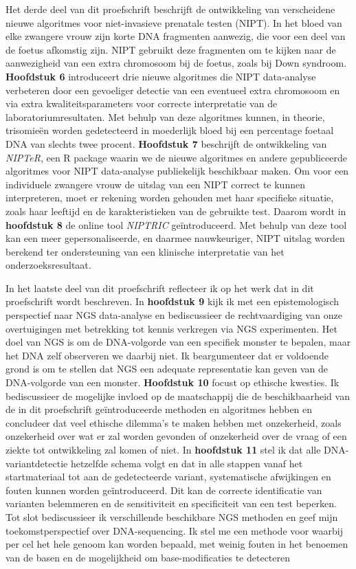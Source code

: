 \begin{appendices}
	Het derde deel van dit proefschrift beschrijft de ontwikkeling van verscheidene nieuwe algoritmes voor niet-invasieve prenatale testen (NIPT). In het bloed van elke zwangere vrouw zijn korte DNA fragmenten aanwezig, die voor een deel van de foetus afkomstig zijn. NIPT gebruikt deze fragmenten om te kijken naar de aanwezigheid van een extra chromosoom bij de foetus, zoals bij Down syndroom. \textbf{Hoofdstuk 6} introduceert drie nieuwe algoritmes die NIPT data-analyse verbeteren door een gevoeliger detectie van een eventueel extra chromosoom en via extra kwaliteitsparameters voor correcte interpretatie van de laboratoriumresultaten. Met behulp van deze algoritmes kunnen, in theorie, trisomieën worden gedetecteerd in moederlijk bloed bij een percentage foetaal DNA van slechts twee procent. \textbf{Hoofdstuk 7} beschrijft de ontwikkeling van \textsl{NIPTeR}, een R package waarin we de nieuwe algoritmes en andere gepubliceerde algoritmes voor NIPT data-analyse publiekelijk beschikbaar maken. Om voor een individuele zwangere vrouw de uitslag van een NIPT correct te kunnen interpreteren, moet er rekening worden gehouden met haar specifieke situatie, zoals haar leeftijd en de karakteristieken van de gebruikte test. Daarom wordt in \textbf{hoofdstuk 8} de online tool \textsl{NIPTRIC} geïntroduceerd. Met behulp van deze tool kan een meer gepersonaliseerde, en daarmee nauwkeuriger, NIPT uitslag worden berekend ter ondersteuning van een klinische interpretatie van het onderzoeksresultaat. 
	
	In het laatste deel van dit proefschrift reflecteer ik op het werk dat in dit proefschrift wordt beschreven. In \textbf{hoofdstuk 9} kijk ik met een epistemologisch perspectief naar NGS data-analyse en bediscussieer de rechtvaardiging van onze overtuigingen met betrekking tot kennis verkregen via NGS experimenten. Het doel van NGS is om de DNA-volgorde van een specifiek monster te bepalen, maar het DNA zelf observeren we daarbij niet. Ik beargumenteer dat er voldoende grond is om te stellen dat NGS een adequate representatie kan geven van de DNA-volgorde van een monster. \textbf{Hoofdstuk 10} focust op ethische kwesties. Ik bediscussieer de mogelijke invloed op de maatschappij die de beschikbaarheid van de in dit proefschrift geïntroduceerde methoden en algoritmes hebben en concludeer dat veel ethische dilemma’s te maken hebben met onzekerheid, zoals onzekerheid over wat er zal worden gevonden of onzekerheid over de vraag of een ziekte tot ontwikkeling zal komen of niet. In \textbf{hoofdstuk 11} stel ik dat alle DNA-variantdetectie hetzelfde schema volgt en dat in alle stappen vanaf het startmateriaal tot aan de gedetecteerde variant, systematische afwijkingen en fouten kunnen worden geïntroduceerd. Dit kan de correcte identificatie van varianten belemmeren en de sensitiviteit en specificiteit van een test beperken. Tot slot bediscussieer ik verschillende beschikbare NGS methoden en geef mijn toekomstperspectief over DNA-sequencing. Ik stel me een methode voor waarbij per cel het hele genoom kan worden bepaald, met weinig fouten in het benoemen van de basen en de mogelijkheid om base-modificaties te detecteren
	

\end{appendices}
